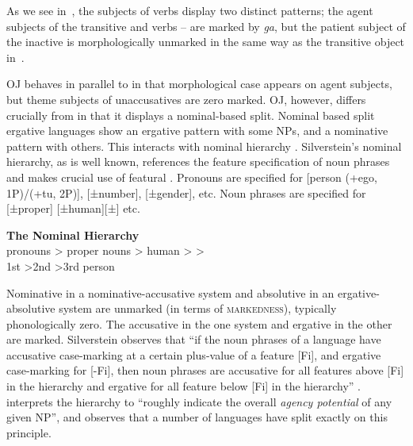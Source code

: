 \documentclass[output=paper]{LSP/langsci}
\begin{document}
As we see in~, the subjects of  verbs display two distinct patterns; the agent subjects of the transitive and   verbs – are marked by \textit{ga}, but the patient subject of the inactive   is morphologically unmarked in the same way as the transitive object in~. 

OJ behaves in parallel to  in that morphological case appears on agent subjects, but theme subjects of unaccusatives are zero marked. OJ, however, differs crucially from  in that it displays a nominal-based split. Nominal based split ergative languages show an ergative pattern with some NPs, and a nominative pattern with others. This interacts with  nominal hierarchy . Silverstein’s nominal hierarchy, as is well known, references the feature specification of noun phrases and makes crucial use of featural . Pronouns are specified for [person (+ego, 1P)/(+tu, 2P)], [±number], [±gender], etc. Noun phrases are specified for [±proper] [±human][±] etc.

\begin{exe}
\ex%
\label{14-ya-ex:7}
\textbf{The Nominal Hierarchy} \citep{Silverstein1976Hierarchy}\\
pronouns > proper nouns > human >  > \\
1st >2nd >3rd person\\
\end{exe}

Nominative in a nominative-accusative system and absolutive in an ergative-absolu\-tive system are unmarked (in terms of \textsc{markedness}), typically phonologically zero. The accusative in the one system and ergative in the other are marked. Silverstein observes that “if the noun phrases of a language have accusative case-marking at a certain plus-value of a feature [Fi], and ergative case-marking for [-Fi], then noun phrases are accusative for all features above [Fi] in the hierarchy and ergative for all feature below [Fi] in the hierarchy” \citep[123]{Silverstein1976Hierarchy}. \citet[86--87]{Dixon1979Ergativity} interprets the hierarchy to “roughly indicate the overall \textit{agency potential} of any given NP”, and observes that a number of languages have split  exactly on this principle. 
\end{document}
